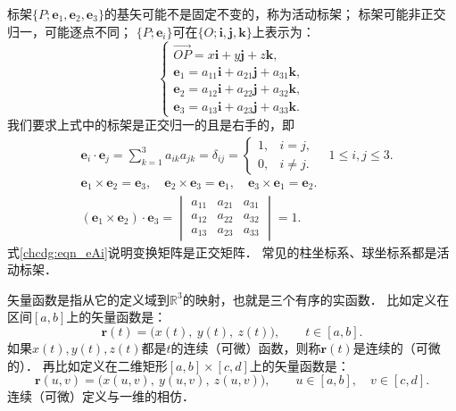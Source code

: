 标架$\{P;\boldsymbol{e}_1,\boldsymbol{e}_2,\boldsymbol{e}_3\}$的基矢可能不是固定不变的，称为{\heiti 活动标架}；
标架可能非正交归一，可能逐点不同；
$\{P;\boldsymbol{e}_i\}$可在$\{O;\boldsymbol{i},\boldsymbol{j},\boldsymbol{k}\}$上表示为：
\begin{equation}\label{chcdg:eqn_eAi}
\begin{cases}
    \overrightarrow{OP} = x \boldsymbol{i} + y \boldsymbol{j} + z \boldsymbol{k} , \\
    \boldsymbol{e}_1 =  a_{11} \boldsymbol{i} + a_{21} \boldsymbol{j} + a_{31} \boldsymbol{k} , \\
    \boldsymbol{e}_2 =  a_{12} \boldsymbol{i} + a_{22} \boldsymbol{j} + a_{32} \boldsymbol{k} , \\
    \boldsymbol{e}_3 =  a_{13} \boldsymbol{i} + a_{23} \boldsymbol{j} + a_{33} \boldsymbol{k} .
\end{cases}    
\end{equation}
我们要求上式中的标架是正交归一的且是右手的，即
\begin{align}
    &\boldsymbol{e}_i \cdot \boldsymbol{e}_j = \sum_{k=1}^{3} a_{ik} a_{jk} = \delta_{ij}
    =\begin{cases}  1,& i=j, \\ 0,& i\neq j. \end{cases} \quad
    1 \leqslant i,j \leqslant 3. \\
    & \boldsymbol{e}_1\times \boldsymbol{e}_2 =\boldsymbol{e}_3, \quad
    \boldsymbol{e}_2\times \boldsymbol{e}_3 =\boldsymbol{e}_1, \quad
    \boldsymbol{e}_3\times \boldsymbol{e}_1 =\boldsymbol{e}_2. \\
    &(\boldsymbol{e}_1\times \boldsymbol{e}_2)\cdot \boldsymbol{e}_3 =
    \begin{vmatrix}
        a_{11}& a_{21} & a_{31} \\ a_{12}& a_{22} & a_{32} \\a_{13}& a_{23} & a_{33}
    \end{vmatrix} = 1 .
\end{align}
式\eqref{chcdg:eqn_eAi}说明变换矩阵是正交矩阵．
常见的柱坐标系、球坐标系都是活动标架．

{\heiti 矢量函数}是指从它的定义域到$\mathbb{R}^3$的映射，也就是三个有序的实函数．
比如定义在区间$[a,b]$上的矢量函数是：
\begin{equation}
    \boldsymbol{r}(t) = \bigl(x(t), \  y(t),\  z(t)\bigr),\qquad t\in [a,b].
\end{equation}
如果$x(t),y(t),z(t)$都是$t$的连续（可微）函数，则称$\boldsymbol{r}(t)$是连续的（可微的）．
再比如定义在二维矩形$[a,b]\times [c,d]$上的矢量函数是：
\begin{equation}
    \boldsymbol{r}(u,v) = \bigl(x(u,v), \  y(u,v),\  z(u,v)\bigr),
    \qquad u\in [a,b],\quad v\in [c,d].
\end{equation}
连续（可微）定义与一维的相仿．

